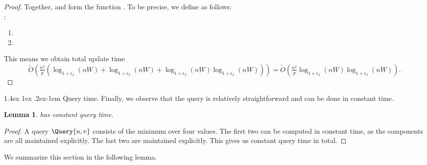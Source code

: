 \documentclass[11pt]{article}
\makeatletter
\newtheorem{lemma}[theorem]{Lemma}
\theoremstyle{definition}
\theoremstyle{remark}
\renewcommand{\paragraph}{%
  \@startsection{paragraph}{4}%
  {\z@}{1.4ex \@plus 1ex \@minus .2ex}{-1em}%
  {\normalfont\normalsize\bfseries}%
}
\makeatother
\begin{document}
\begin{proof}
   Together, \UpdateNbrBunchDSBunchChange and \UpdateAdjacentDSBunchChange form the function \UpdateAdjacentDS. To be precise, we define \UpdateAdjacentDS as follows: \\
:
\begin{enumerate}
    \item {}
    \item {}
\end{enumerate}
This means we obtain total update time $$\tilde O(\tfrac{n^2}{p}(\log_{1+\epsilon_4}(nW)+\log_{1+\epsilon_3}(nW)+\log_{1+\epsilon_3}(nW)\log_{1+\epsilon_4}(nW)))=\tilde O(\tfrac{n^2}{p}\log_{1+\epsilon_4}(nW)\log_{1+\epsilon_3}(nW)).$$
\end{proof}

\paragraph{Query time.}
Finally, we observe that the query is relatively straightforward and can be done in constant time. 

\begin{lemma}
    \DynAPSPtwo has constant query time. 
\end{lemma}
\begin{proof}
    A query $\Query{u,v}$ consists of the minimum over four values. The first two can be computed in constant time, as the components are all maintained explicitly. The last two are maintained explicitly. This gives us constant query time in total. 
\end{proof}



We summarize this section in the following lemma. 
\end{document}
